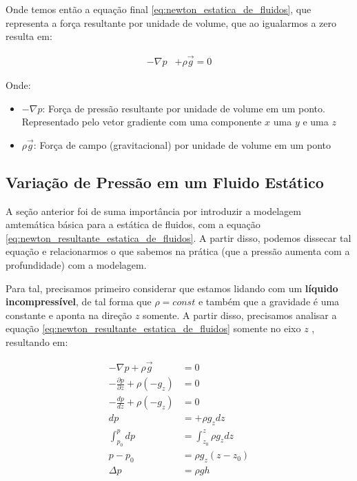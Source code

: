\documentclass{article}
\newcommand{\n}{\nonumber \\ }
\begin{document}
            Onde temos então a equação final \ref{eq:newton_estatica_de_fluidos}, que representa a força resultante por unidade de volume, que ao igualarmos a zero resulta em:

            \begin{align}
                -\nabla p &+ \rho \vec g = 0\label{eq:newton_resultante_estatica_de_fluidos}
            \end{align}

            Onde:
            \begin{itemize}
                \item $-\nabla p$: Força de pressão resultante por unidade de volume em um ponto. Representado pelo vetor gradiente com uma componente $x$ uma $y$ e uma $z$
                \item $\rho \vec g$: Força de campo (gravitacional) por unidade de volume em um ponto
            \end{itemize}

        \subsection{Variação de Pressão em um Fluido Estático}
            A seção anterior foi de suma importância por introduzir a modelagem amtemática básica para a estática de fluidos, com a equação \ref{eq:newton_resultante_estatica_de_fluidos}. A partir
            disso, podemos dissecar tal equação e relacionarmos o que sabemos na prática (que a pressão aumenta com a profundidade) com a modelagem.

            Para tal, precisamos primeiro considerar que estamos lidando com um \textbf{líquido incompressível}, de tal forma que $\rho=const$ e também que a gravidade é uma constante e aponta na
            direção $z$ somente. A partir disso, precisamos analisar a equação \ref{eq:newton_resultante_estatica_de_fluidos} somente no eixo $z$ , resultando em:

            \begin{align}
                -\nabla p + \rho \vec g &= 0 \n
                -\frac{\partial p}{\partial z} + \rho (-g_z) &= 0 \n
                -\frac{dp}{d z} + \rho (-g_z) &= 0 \label{eq:diff_inicial_pressao} \\
                dp &= +\rho g_z dz \n
                \int^p_{p_0} dp &= \int^z_{z_0} \rho g_z dz \n
                p - p_0 &= \rho g_z (z- z_0) \n 
                \Delta p &= \rho g h  \label{eq:final_delta_p_estatica_de_fluidos}
            \end{align}
\end{document}
